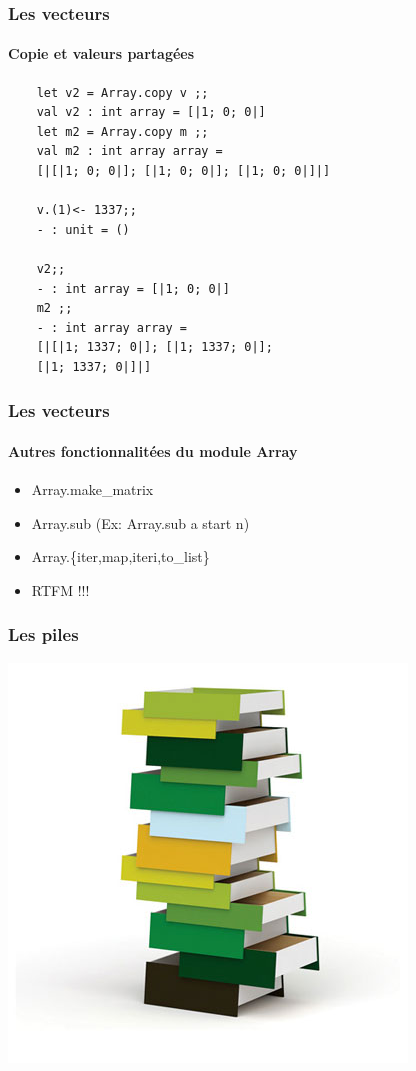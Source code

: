\begin{frame}[fragile]
	\frametitle{Les vecteurs}
	\framesubtitle{Copie et valeurs partagées}
	\begin{lstlisting}
	let v2 = Array.copy v ;;
	val v2 : int array = [|1; 0; 0|]
	let m2 = Array.copy m ;;
	val m2 : int array array = 
	[|[|1; 0; 0|]; [|1; 0; 0|]; [|1; 0; 0|]|]

	v.(1)<- 1337;;
	- : unit = ()

	v2;; 
	- : int array = [|1; 0; 0|]
	m2 ;;
	- : int array array = 
	[|[|1; 1337; 0|]; [|1; 1337; 0|]; 
	[|1; 1337; 0|]|]
	\end{lstlisting}
\end{frame}

\begin{frame}[fragile]
	\frametitle{Les vecteurs}
	\framesubtitle{Autres fonctionnalitées du module Array}
	\begin{itemize}
	\item Array.make\_matrix
	
	\item Array.sub (Ex: Array.sub a start n)
	
	\item Array.\{iter,map,iteri,to\_list\}

	\item RTFM !!!
	\end{itemize}
\end{frame}


\begin{frame}
	\frametitle{Les piles}
	\includegraphics[scale=0.4]{pics/stack.jpg}
\end{frame}

